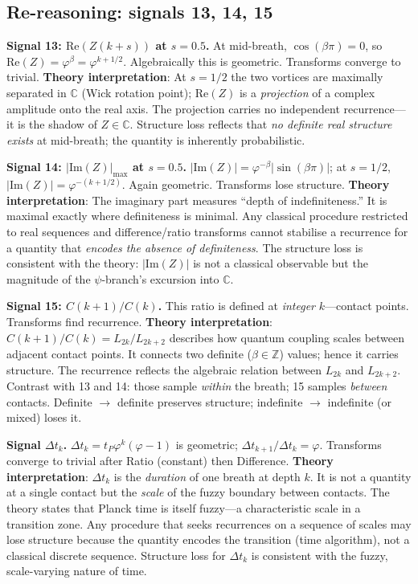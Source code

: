 \documentclass[12pt,a4paper]{article}
\begin{document}
\subsection{Re-reasoning: signals 13, 14, 15}

\textbf{Signal 13: $\mathrm{Re}(Z(k+s))$ at $s=0.5$.} At mid-breath, $\cos(\beta\pi)=0$, so $\mathrm{Re}(Z)=\varphi^\beta = \varphi^{k+1/2}$. Algebraically this is geometric. Transforms converge to trivial. \textbf{Theory interpretation}: At $s=1/2$ the two vortices are maximally separated in $\mathbb{C}$ (Wick rotation point); $\mathrm{Re}(Z)$ is a \emph{projection} of a complex amplitude onto the real axis. The projection carries no independent recurrence---it is the shadow of $Z \in \mathbb{C}$. Structure loss reflects that \emph{no definite real structure exists} at mid-breath; the quantity is inherently probabilistic.

\textbf{Signal 14: $|\mathrm{Im}(Z)|_{\max}$ at $s=0.5$.} $|\mathrm{Im}(Z)| = \varphi^{-\beta}|\sin(\beta\pi)|$; at $s=1/2$, $|\mathrm{Im}(Z)| = \varphi^{-(k+1/2)}$. Again geometric. Transforms lose structure. \textbf{Theory interpretation}: The imaginary part measures ``depth of indefiniteness.'' It is maximal exactly where definiteness is minimal. Any classical procedure restricted to real sequences and difference/ratio transforms cannot stabilise a recurrence for a quantity that \emph{encodes the absence of definiteness}. The structure loss is consistent with the theory: $|\mathrm{Im}(Z)|$ is not a classical observable but the magnitude of the $\psi$-branch's excursion into $\mathbb{C}$.

\textbf{Signal 15: $C(k+1)/C(k)$.} This ratio is defined at \emph{integer} $k$---contact points. Transforms find recurrence. \textbf{Theory interpretation}: $C(k+1)/C(k) = L_{2k}/L_{2k+2}$ describes how quantum coupling scales between adjacent contact points. It connects two definite ($\beta \in \mathbb{Z}$) values; hence it carries structure. The recurrence reflects the algebraic relation between $L_{2k}$ and $L_{2k+2}$. Contrast with 13 and 14: those sample \emph{within} the breath; 15 samples \emph{between} contacts. Definite $\to$ definite preserves structure; indefinite $\to$ indefinite (or mixed) loses it.

\textbf{Signal $\Delta t_k$.} $\Delta t_k = t_P\varphi^k(\varphi-1)$ is geometric; $\Delta t_{k+1}/\Delta t_k = \varphi$. Transforms converge to trivial after Ratio (constant) then Difference. \textbf{Theory interpretation}: $\Delta t_k$ is the \emph{duration} of one breath at depth $k$. It is not a quantity at a single contact but the \emph{scale} of the fuzzy boundary between contacts. The theory states that Planck time is itself fuzzy---a characteristic scale in a transition zone. Any procedure that seeks recurrences on a sequence of scales may lose structure because the quantity encodes the transition (time algorithm), not a classical discrete sequence. Structure loss for $\Delta t_k$ is consistent with the fuzzy, scale-varying nature of time.
\end{document}
